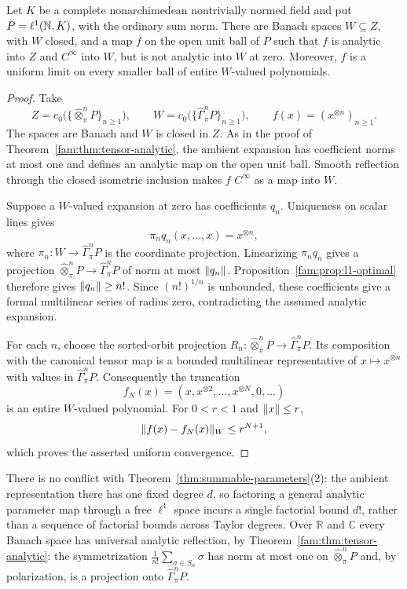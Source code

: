 \begin{corollary}
\label{fam:cor:no-common-radius}
Let $K$ be a complete nonarchimedean nontrivially normed field and put
$P=\ell^1(\mathbb N,K)$, with the ordinary sum norm. There are Banach spaces
$W\subseteq Z$, with $W$ closed, and a map $f$ on the open unit ball of $P$
such that $f$ is analytic into $Z$ and $C^\infty$ into $W$, but is not analytic
into $W$ at zero. Moreover, $f$ is a uniform limit on every smaller ball of
entire $W$\nobreakdash-valued polynomials.
\end{corollary}

\begin{proof}
Take
\[
 Z=c_0\bigl(\{\widehat\otimes^n_\pi P\}_{n\ge1}\bigr),\qquad
 W=c_0\bigl(\{\widehat\Gamma^n_\pi P\}_{n\ge1}\bigr),\qquad
 f(x)=(x^{\otimes n})_{n\ge1}.
\]
The spaces are Banach and $W$ is closed in $Z$. As in the proof of
Theorem~\ref{fam:thm:tensor-analytic}, the ambient expansion has coefficient
norms at most one and defines an analytic map on the open unit ball.
Smooth reflection through the closed isometric inclusion makes $f$
$C^\infty$ as a map into $W$.

Suppose a $W$\nobreakdash-valued expansion at zero has coefficients $q_n$.
Uniqueness on scalar lines gives
\[
 \pi_nq_n(x,\ldots,x)=x^{\otimes n},
\]
where $\pi_n\colon W\to\widehat\Gamma^n_\pi P$ is the coordinate projection.
Linearizing $\pi_nq_n$ gives a projection
$\widehat\otimes^n_\pi P\to\widehat\Gamma^n_\pi P$ of norm at most $\lVert q_n\rVert$.
Proposition~\ref{fam:prop:l1-optimal} therefore gives
$\lVert q_n\rVert\ge n!$. Since $(n!)^{1/n}$ is unbounded, these coefficients
give a formal multilinear series of radius zero, contradicting the assumed analytic expansion.

For each $n$, choose the sorted-orbit projection
$R_n\colon \widehat\otimes^n_\pi P\to\widehat\Gamma^n_\pi P$. Its composition with the canonical
tensor map is a bounded multilinear representative of $x\mapsto x^{\otimes n}$
with values in $\widehat\Gamma^n_\pi P$. Consequently the truncation
\[
 f_N(x)=(x,x^{\otimes2},\ldots,x^{\otimes N},0,\ldots)
\]
is an entire $W$\nobreakdash-valued polynomial. For $0<r<1$ and $\lVert x\rVert\le r$,
\[
 \lVert f(x)-f_N(x)\rVert_W\le r^{N+1},
\]
which proves the asserted uniform convergence.
\end{proof}


There is no conflict with Theorem~\ref{thm:summable-parameters}(2): the ambient representation there has one fixed
degree $d$, so factoring a general analytic parameter map through a free $\ell^1$ space incurs a single factorial
bound $d!$, rather than a sequence of factorial bounds across Taylor degrees.
Over $\mathbb R$ and $\mathbb C$ every Banach space has universal analytic reflection, by Theorem~\ref{fam:thm:tensor-analytic}: the symmetrization $\frac1{n!}\sum_{\sigma\in S_n}\sigma$ has norm at most one on $\widehat\otimes^n_\pi P$ and, by polarization, is a projection onto $\widehat\Gamma^n_\pi P$.
